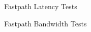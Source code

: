\documentclass[12pt,titlepage]{article}
\begin{document}
\begin{figure}
	\centering
	\caption{Fastpath Latency Tests}%
	\label{fig:freeflow_latency}
\end{figure}

\begin{figure}
	\centering
	\caption{Fastpath Bandwidth Tests}%
	\label{fig:freeflow_bandwidth}
\end{figure}
\end{document}
